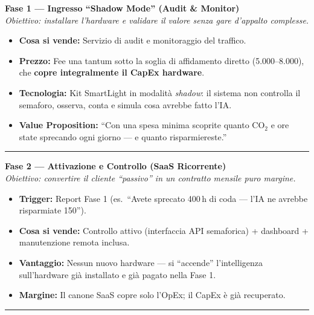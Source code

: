 \documentclass[a4paper,11pt]{article}
\begin{document}
\begin{tcolorbox}[
    enhanced, colback=blue!5!white, colframe=SmartBlue,
    title=\textbf{La Strategia in 3 Fasi},
    fonttitle=\bfseries\large, boxrule=0.5mm, drop shadow
]

\textbf{\large Fase 1 --- Ingresso ``Shadow Mode'' (Audit \& Monitor)} \\
\textit{Obiettivo: installare l'hardware e validare il valore senza gare d'appalto complesse.}
\begin{itemize}[leftmargin=*, nosep, topsep=5pt]
    \item \textbf{Cosa si vende:} Servizio di audit e monitoraggio del traffico.
    \item \textbf{Prezzo:} Fee una tantum sotto la soglia di affidamento diretto (\texteuro{}5.000--8.000), che \textbf{copre integralmente il CapEx hardware}.
    \item \textbf{Tecnologia:} Kit SmartLight in modalità \textit{shadow}: il sistema non controlla il semaforo, osserva, conta e simula cosa avrebbe fatto l'IA.
    \item \textbf{Value Proposition:} ``Con una spesa minima scoprite quanto CO$_2$ e ore state sprecando ogni giorno --- e quanto risparmiereste.''
\end{itemize}
\vspace{0.3cm}\hrule\vspace{0.3cm}

\textbf{\large Fase 2 --- Attivazione e Controllo (SaaS Ricorrente)} \\
\textit{Obiettivo: convertire il cliente ``passivo'' in un contratto mensile puro margine.}
\begin{itemize}[leftmargin=*, nosep, topsep=5pt]
    \item \textbf{Trigger:} Report Fase 1 (es.\ ``Avete sprecato 400\,h di coda --- l'IA ne avrebbe risparmiate 150'').
    \item \textbf{Cosa si vende:} Controllo attivo (interfaccia API semaforica) + dashboard + manutenzione remota inclusa.
    \item \textbf{Vantaggio:} Nessun nuovo hardware --- si ``accende'' l'intelligenza sull'hardware già installato e già pagato nella Fase 1.
    \item \textbf{Margine:} Il canone SaaS copre solo l'OpEx; il CapEx è già recuperato.
\end{itemize}
\vspace{0.3cm}\hrule\vspace{0.3cm}


\end{tcolorbox}
\end{document}
